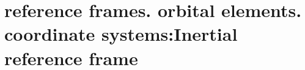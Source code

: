 \section{ reference frames. orbital elements. coordinate systems:Inertial reference frame  }\label{sec:q1}    
